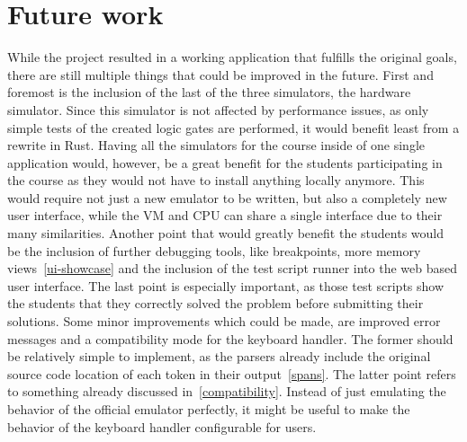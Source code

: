\section{Future work}
\label{future-work}
While the project resulted in a working application that fulfills the original goals, there are still multiple things that could be improved in the future.
First and foremost is the inclusion of the last of the three simulators, the hardware simulator.
Since this simulator is not affected by performance issues, as only simple tests of the created logic gates are performed, it would benefit least from a rewrite in Rust.
Having all the simulators for the course inside of one single application would, however, be a great benefit for the students participating in the course as they would not have to install anything locally anymore.
This would require not just a new emulator to be written, but also a completely new user interface, while the VM and CPU can share a single interface due to their many similarities.
Another point that would greatly benefit the students would be the inclusion of further debugging tools, like breakpoints, more memory views~\ref{ui-showcase} and the inclusion of the test script runner into the web based user interface.
The last point is especially important, as those test scripts show the students that they correctly solved the problem before submitting their solutions.
Some minor improvements which could be made, are improved error messages and a compatibility mode for the keyboard handler.
The former should be relatively simple to implement, as the parsers already include the original source code location of each token in their output~\ref{spans}.
The latter point refers to something already discussed in~\cref{compatibility}.
Instead of just emulating the behavior of the official emulator perfectly, it might be useful to make the behavior of the keyboard handler configurable for users.

